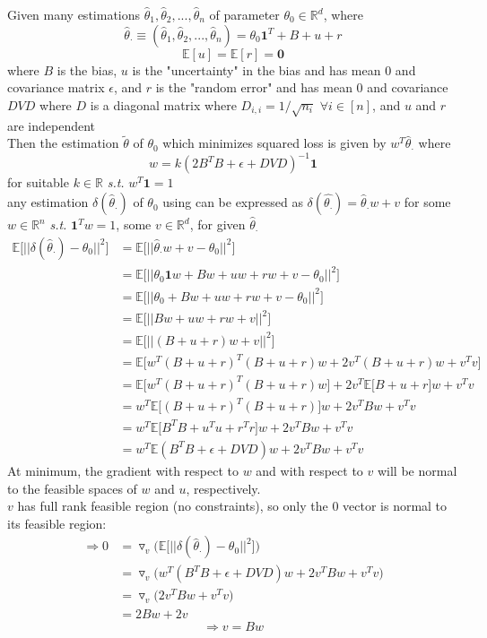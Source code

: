 \documentclass{article}
\begin{document}
\theorem Given many estimations $\hat{\theta}_1,\hat{\theta}_2,...,\hat{\theta}_n$ of parameter $\theta_0 \in \mathbb{R}^d$, where
\[ \hat{\theta}_\cdot \equiv (\hat{\theta}_1,\hat{\theta}_2,...,\hat{\theta}_n) = \theta_0\mathbf{1}^T + B + u + r \]
\[ \mathbb{E}[u] = \mathbb{E}[r] = \mathbf{0} \]
where $B$ is the bias, $u$ is the "uncertainty" in the bias and has mean $0$ and covariance matrix $\epsilon$, and $r$ is the "random error" and has mean $0$ and covariance $DVD$ where $D$ is a diagonal matrix where $D_{i,i} = 1/\sqrt{n_i}$ $\forall i \in [n]$, and $u$ and $r$ are independent \\
Then the estimation $\tilde{\theta}$ of $\theta_0$ which minimizes squared loss is given by $w^T\hat{\theta}_\cdot$ where
\[ w = k(2B^TB + \epsilon + DVD)^{-1}\mathbf{1} \]
for suitable $k \in \mathbb{R}$ {\it s.t.} $w^T\mathbf{1} = 1$ \\
\proof any estimation $\delta(\hat{\theta}_\cdot)$ of $\theta_0$ using can be expressed as $\delta(\hat{\theta_\cdot}) = \hat{\theta}_\cdot w + v$ for some $w \in \mathbb{R}^n$ {\it s.t.} $\mathbf{1}^Tw = 1$, some $v \in \mathbb{R}^d$, for given $\hat{\theta}_\cdot$
\begin{align*}
\mathbb{E}\big[||\delta(\hat{\theta}_\cdot) - \theta_0||^2\big] &= \mathbb{E}\big[||\hat{\theta}_\cdot w + v - \theta_0||^2\big]
\\&= \mathbb{E}\big[||\theta_0\mathbf{1}w+Bw + uw + rw + v - \theta_0||^2\big]
\\&= \mathbb{E}\big[||\theta_0+Bw + uw + rw + v - \theta_0||^2\big]
\\&= \mathbb{E}\big[||Bw + uw + rw + v||^2\big]
\\&= \mathbb{E}\big[||(B+u+r)w + v||^2\big]
\\&= \mathbb{E}\big[w^T(B+u+r)^T(B+u+r)w + 2v^T(B+u+r)w + v^Tv\big]
\\&= \mathbb{E}\big[w^T(B+u+r)^T(B+u+r)w\big] + 2v^T\mathbb{E}\big[B+u+r\big]w + v^Tv
\\&= w^T\mathbb{E}\big[(B+u+r)^T(B+u+r)\big]w + 2v^TBw+ v^Tv
\\&= w^T\mathbb{E}\big[B^TB + u^Tu + r^Tr\big]w + 2v^TBw+ v^Tv
\\&= w^T\mathbb{E}(B^TB + \epsilon + DVD)w + 2v^TBw+ v^Tv
\end{align*}
At minimum, the gradient with respect to $w$ and with respect to $v$ will be normal to the feasible spaces of $w$ and $u$, respectively. \\

$v$ has full rank feasible region (no constraints), so only the $0$ vector is normal to its feasible region:
\begin{align*}
\Rightarrow 0 &= \triangledown_v \bigg(\mathbb{E}\big[||\delta(\hat{\theta}_\cdot) - \theta_0||^2\big]\bigg)
\\&= \triangledown_v \Big(w^T(B^TB + \epsilon + DVD)w + 2v^TBw+ v^Tv\Big)
\\&= \triangledown_v \Big(2v^TBw+ v^Tv\Big)
\\&= 2Bw+ 2v
\end{align*}
\[ \Rightarrow v = Bw \]
\end{document}
